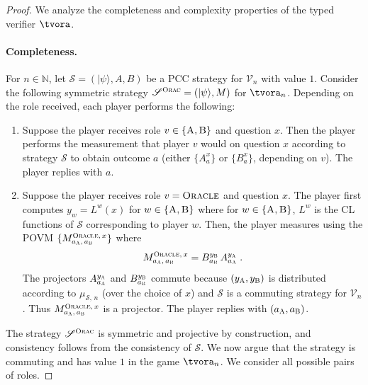 \documentclass[11pt]{article}
\theoremstyle{definition}
\newcommand{\ket}[1]{|#1\rangle}
\newcommand{\N}{\ensuremath{\mathbb{N}}}
\newcommand{\sampler}{\mathcal{S}}
\newcommand{\verifier}{\mathcal{V}}
\newcommand{\strategy}{\mathscr{S}}
\newcommand{\gamestyle}[1]{\ensuremath{\textsc{#1}}\xspace}
\newcommand{\ora}{\gamestyle{Orac}}
\newcommand{\labelstyle}[1]{\ensuremath{\textsc{#1}}\xspace}
\newcommand{\alice}{\labelstyle{A}}
\newcommand{\bob}{\labelstyle{B}}
\newcommand{\oracle}{\labelstyle{Oracle}}
\newcommand{\ab}{\{\alice, \bob\}}
\newcommand{\typestyle}[1]{\ensuremath{\textsc{#1}}\xspace}
\newcommand{\Oracle}{\typestyle{Oracle}}
\begin{document}
\begin{proof}
  We analyze the completeness and complexity properties of the typed verifier
  $\tvora$.

  \paragraph{Completeness.}
  For $n \in \N$, let $\strategy = (\ket{\psi},A,B)$ be a PCC strategy for
  $\verifier_n$ with value $1$.
  Consider the following symmetric strategy $\strategy^\ora = (\ket{\psi}, M)$
  for $\tvora_n$.
  Depending on the role received, each player performs the following:
  \begin{enumerate}
	\item Suppose the player receives role $v \in \{\alice,\bob\}$ and question
    $x$.
    Then the player performs the measurement that player $v$ would on question
    $x$ according to strategy $\strategy$ to obtain outcome $a$ (either
    $\{A^{x}_a\}$ or $\{B^x_a\}$, depending on $v$).
    The player replies with $a$.
		\label{enu:oracle-honest-isolated}
		
	\item Suppose the player receives role $v = \oracle$ and question $x$.
    The player first computes $y_w = L^w(x)$ for $w \in \{\alice,\bob\}$ where
    for $w\in \ab$, $L^w$ is the CL functions of $\sampler$ corresponding to
    player $w$.
    Then, the player measures using the POVM $\{ M^{\Oracle,\, x}_{a_\alice,\,
      a_\bob}\}$ where
    \begin{equation}
      \label{eq:oracle-honest}
      M^{\oracle,\, x}_{a_\alice,\, a_\bob} = B^{y_\bob}_{a_\bob}\,
      A^{y_\alice}_{a_\alice}\;.
    \end{equation}
    The projectors $A^{y_\alice}_{a_\alice}$ and $B^{y_\bob}_{a_\bob}$
    commute because $(y_\alice, y_\bob)$ is distributed according to
    $\mu_{\sampler,\, n}$ (over the choice of $x$) and $\strategy$ is a
    commuting strategy for $\verifier_n$.
    Thus $M^{\oracle,\, x}_{a_\alice,\, a_\bob}$ is a projector.
    The player replies with $(a_\alice, a_\bob)$.
		\label{enu:oracle-honest-oracle}
  \end{enumerate}

  The strategy $\strategy^\ora$ is symmetric and projective by construction, and
  consistency follows from the consistency of $\strategy$.
  We now argue that the strategy is commuting and has value $1$ in the game
  $\tvora_n$.
  We consider all possible pairs of roles.


\end{proof}
\end{document}
